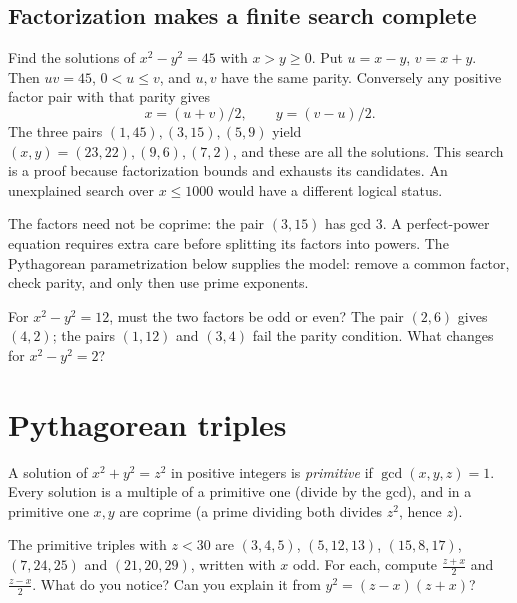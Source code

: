 \subsection*{Factorization makes a finite search complete}
Find the solutions of $x^2-y^2=45$ with $x>y\ge0$. Put
$u=x-y$, $v=x+y$. Then $uv=45$, $0<u\le v$, and $u,v$ have the same parity.
Conversely any positive factor pair with that parity gives
\[
x=(u+v)/2,\qquad y=(v-u)/2.
\]
The three pairs $(1,45),(3,15),(5,9)$ yield
$(x,y)=(23,22),(9,6),(7,2)$, and these are all the solutions.
This search is a proof because factorization bounds and exhausts its candidates.
An unexplained search over $x\le1000$ would have a different logical status.

The factors need not be coprime: the pair $(3,15)$ has gcd $3$.
A perfect-power equation requires extra care before splitting its factors
into powers. The Pythagorean parametrization below supplies the model:
remove a common factor, check parity, and only then use prime exponents.

\begin{think}
For $x^2-y^2=12$, must the two factors be odd or even?
The pair $(2,6)$ gives $(4,2)$; the pairs $(1,12)$ and $(3,4)$ fail the
parity condition. What changes for $x^2-y^2=2$?
\end{think}

\section{Pythagorean triples}

A solution of $x^2+y^2=z^2$ in positive integers is \emph{primitive} if $\gcd(x,y,z)=1$. Every solution is a multiple of a primitive one (divide by the gcd), and in a primitive one $x,y$ are coprime (a prime dividing both divides $z^2$, hence $z$).

\begin{think}
The primitive triples with $z<30$ are $(3,4,5)$, $(5,12,13)$, $(15,8,17)$, $(7,24,25)$ and $(21,20,29)$, written with $x$ odd. For each, compute $\frac{z+x}2$ and $\frac{z-x}2$. What do you notice? Can you explain it from $y^2=(z-x)(z+x)$?
\end{think}

